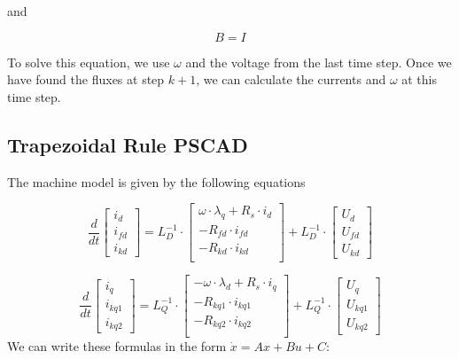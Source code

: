 and

\begin{equation}
B = I
\end{equation}

To solve this equation, we use $\omega$ and the voltage from the last time step.
Once we have found the fluxes at step $k+1$, we can calculate the currents and $\omega$ at this time step.

\subsection{Trapezoidal Rule PSCAD}

The machine model is given by the following equations

\begin{equation}
\frac{d}{dt}
\begin{bmatrix}
i_d \\
i_{fd} \\
i_{kd}
\end{bmatrix}
=
L_D^{-1} \cdot
\begin{bmatrix}
\omega \cdot \lambda_q + R_s \cdot i_d \\
- R_{fd} \cdot i_{fd} \\
- R_{kd} \cdot i_{kd} \\
\end{bmatrix}
+
L_D^{-1} \cdot
\begin{bmatrix}
U_d \\
U_{fd}\\
U_{kd}
\end{bmatrix}
\end{equation}

\begin{equation}
\frac{d}{dt}
\begin{bmatrix}
i_q \\
i_{kq1} \\
i_{kq2}
\end{bmatrix}
=
L_Q^{-1} \cdot
\begin{bmatrix}
- \omega \cdot \lambda_d + R_s \cdot i_q \\
- R_{kq1} \cdot i_{kq1} \\
- R_{kq2} \cdot i_{kq2} \\
\end{bmatrix}
+
L_Q^{-1} \cdot
\begin{bmatrix}
U_q \\
U_{kq1}\\
U_{kq2}
\end{bmatrix}
\end{equation}
%
We can write these formulas in the form $\dot{x} = Ax + Bu + C$:


